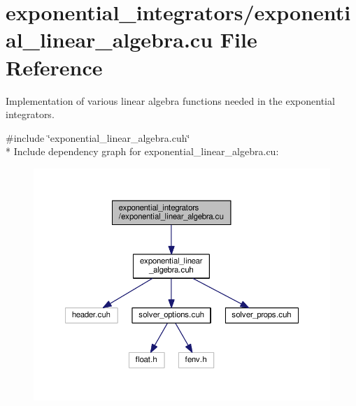 \hypertarget{exponential__linear__algebra_8cu}{}\section{exponential\+\_\+integrators/exponential\+\_\+linear\+\_\+algebra.cu File Reference}
\label{exponential__linear__algebra_8cu}


Implementation of various linear algebra functions needed in the exponential integrators.  


{\ttfamily \#include \char`\"{}exponential\+\_\+linear\+\_\+algebra.\+cuh\char`\"{}}\\*
Include dependency graph for exponential\+\_\+linear\+\_\+algebra.\+cu\+:\nopagebreak
\begin{figure}[H]
\begin{center}
\leavevmode
\includegraphics[width=350pt]{exponential__linear__algebra_8cu__incl}
\end{center}
\end{figure}
